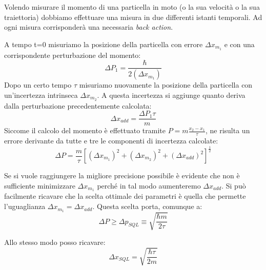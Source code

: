 \begin{esempio}

    Volendo misurare il momento di una particella in moto (o la sua velocità o la sua traiettoria) dobbiamo effettuare una misura in due differenti istanti temporali. Ad ogni misura corrisponderà una necessaria \textit{back action}.
    
    \noindent A tempo t=0 misuriamo la posizione della particella con errore $\Delta x_{m_1}$ e con una corrispondente perturbazione del momento:
    \begin{equation*}
        \Delta P_1 = \frac{\hbar}{2(\Delta x_{m_1})}
    \end{equation*}
    Dopo un certo tempo $\tau$ misuriamo nuovamente la posizione della particella con un'incertezza intrinseca $\Delta x_{m_2}$. A questa incertezza si aggiunge quanto deriva dalla perturbazione precedentemente calcolata:
    \begin{equation*}
        \Delta x_{add} = \frac{\Delta P_1\tau}{m}
    \end{equation*}
    Siccome il calcolo del momento è effettuato tramite $P=m\frac{x_2 - x_1 }{\tau}$, ne risulta un errore derivante da tutte e tre le componenti di incertezza calcolate:
    \begin{equation*}
        \Delta P = \frac{m}{\tau} \left[  \left( \Delta x_{m_1}\right)^2 + \left( \Delta x_{m_2}\right)^2 +\left( \Delta x_{add}\right)^2   \right]^{\frac{1}{2}}
    \end{equation*}
    
    \noindent Se si vuole raggiungere la migliore precisione possibile è evidente che non è sufficiente minimizzare $\Delta x_{m_1}$ perché in tal modo aumenteremo $\Delta x_{add}$. Si può facilmente ricavare che la scelta ottimale dei parametri è quella che permette l'uguaglianza $\Delta x _{m_1} = \Delta x_{add}$. Questa scelta porta, comunque a:
    \begin{equation*}
        \Delta P \ge \Delta p_{SQL} \equiv \sqrt{\frac{\hbar m}{2\tau}}
    \end{equation*}

    Allo stesso modo posso ricavare:
    \begin{equation*}
        \Delta x_{SQL} = \sqrt{\frac{\hbar \tau }{2m}}
    \end{equation*}

\end{esempio}


